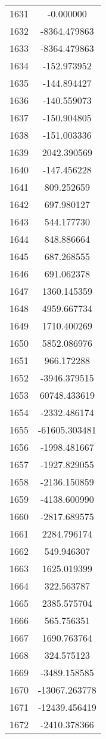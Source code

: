\documentclass[12pt]{article}
\begin{document}
\begin{longtable}{@{}cc@{}}
1631 & -0.000000 \\
1632 & -8364.479863 \\
1633 & -8364.479863 \\
1634 & -152.973952 \\
1635 & -144.894427 \\
1636 & -140.559073 \\
1637 & -150.904805 \\
1638 & -151.003336 \\
1639 & 2042.390569 \\
1640 & -147.456228 \\
1641 & 809.252659 \\
1642 & 697.980127 \\
1643 & 544.177730 \\
1644 & 848.886664 \\
1645 & 687.268555 \\
1646 & 691.062378 \\
1647 & 1360.145359 \\
1648 & 4959.667734 \\
1649 & 1710.400269 \\
1650 & 5852.086976 \\
1651 & 966.172288 \\
1652 & -3946.379515 \\
1653 & 60748.433619 \\
1654 & -2332.486174 \\
1655 & -61605.303481 \\
1656 & -1998.481667 \\
1657 & -1927.829055 \\
1658 & -2136.150859 \\
1659 & -4138.600990 \\
1660 & -2817.689575 \\
1661 & 2284.796174 \\
1662 & 549.946307 \\
1663 & 1625.019399 \\
1664 & 322.563787 \\
1665 & 2385.575704 \\
1666 & 565.756351 \\
1667 & 1690.763764 \\
1668 & 324.575123 \\
1669 & -3489.158585 \\
1670 & -13067.263778 \\
1671 & -12439.456419 \\
1672 & -2410.378366 \\

\end{longtable}
\end{document}
